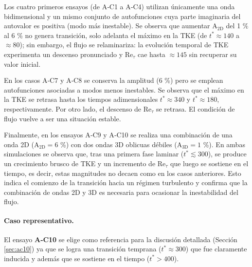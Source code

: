 Los cuatro primeros ensayos (de A‑C1 a A‑C4) utilizan únicamente una onda bidimensional y un mismo conjunto de autofunciones cuya parte imaginaria del autovalor es positiva (modo más inestable). Se observa que aumentar A$_\text{2D}$ del 1 \% al 6 \% no genera transición, solo adelanta el máximo en la TKE (de $t^* \approx 140$ a $\approx 80$); sin embargo, el flujo se relaminariza: la evolución temporal de TKE experimenta un descenso pronunciado y Re$_{\tau}$ cae hasta $\approx 145$ sin recuperar su valor inicial.

En los casos A‑C7 y A‑C8 se conserva la amplitud (6 \%) pero se emplean autofunciones asociadas a modos menos inestables. Se observa que el máximo en la TKE se retrasa hasta los tiempos adimensionales $t^* \approx 340$ y $t^* \approx 180$, respectivamente. Por otro lado, el descenso de Re$_{\tau}$ se retrasa. El condición de flujo vuelve a ser una situación estable.

Finalmente, en los ensayos A‑C9 y A‑C10 se realiza una combinación de una onda 2D (A$_\text{2D}=6$ \%) con dos ondas 3D oblicuas débiles (A$_\text{3D}=1$ \%). En ambas simulaciones se observa que, tras una primera fase laminar ($t^*\lesssim 300$), se produce un crecimiento brusco de TKE y un incremento de Re$_{\tau}$ que luego se sostiene en el tiempo, es decir, estas magnitudes no decaen como en los casos anteriores. Esto indica el comienzo de la transición hacia un régimen turbulento y confirma que la combinación de ondas 2D y 3D es necesaria para ocasionar la inestabilidad del flujo.

\paragraph{Caso representativo.} El ensayo \textbf{A‑C10} se elige como referencia para la discusión detallada (Sección \ref{sec:ac10}) ya que se logra una transición temprana ($t^* \approx 300$) que fue claramente inducida y además que se sostiene en el tiempo ($t^*>400$). 

